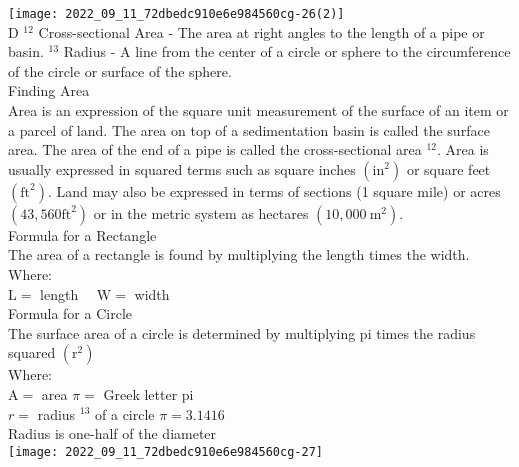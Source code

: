 \texttt{[image: 2022\_09\_11\_72dbedc910e6e984560cg-26(2)]}\\

D ${ }^{12}$ Cross-sectional Area - The area at right angles to the length of a pipe or basin. ${ }^{13}$ Radius - A line from the center of a circle or sphere to the circumference of the circle or surface of the sphere.\\

Finding Area\\

Area is an expression of the square unit measurement of the surface of an item or a parcel of land. The area on top of a sedimentation basin is called the surface area. The area of the end of a pipe is called the cross-sectional area ${ }^{12}$. Area is usually expressed in squared terms such as square inches $\left(\mathrm{in}^{2}\right)$ or square feet $\left(\mathrm{ft}^{2}\right)$. Land may also be expressed in terms of sections (1 square mile) or acres $\left(43,560 \mathrm{ft}^{2}\right)$ or in the metric system as hectares $\left(10,000 \mathrm{~m}^{2}\right)$.\\

Formula for a Rectangle\\

The area of a rectangle is found by multiplying the length times the width.\\

Where:\\

$\mathrm{L}=$ length $\quad \mathrm{W}=$ width\\

Formula for a Circle\\

The surface area of a circle is determined by multiplying pi times the radius squared $\left(\mathrm{r}^{2}\right)$\\

Where:\\

$\mathrm{A}=$ area $\pi=$ Greek letter pi\\

$r=$ radius $^{13}$ of a circle $\pi=3.1416$\\

Radius is one-half of the diameter\\

\texttt{[image: 2022\_09\_11\_72dbedc910e6e984560cg-27]}\\

